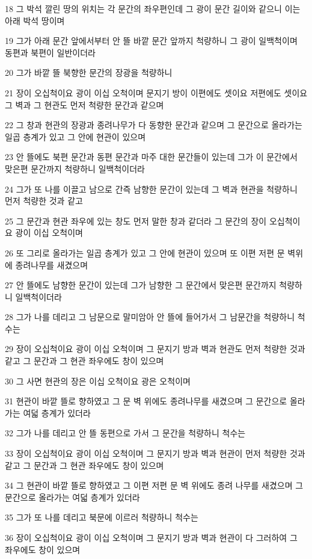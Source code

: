 \par 18 그 박석 깔린 땅의 위치는 각 문간의 좌우편인데 그 광이 문간 길이와 같으니 이는 아래 박석 땅이며
\par 19 그가 아래 문간 앞에서부터 안 뜰 바깥 문간 앞까지 척량하니 그 광이 일백척이며 동편과 북편이 일반이더라
\par 20 그가 바깥 뜰 북향한 문간의 장광을 척량하니
\par 21 장이 오십척이요 광이 이십 오척이며 문지기 방이 이편에도 셋이요 저편에도 셋이요 그 벽과 그 현관도 먼저 척량한 문간과 같으며
\par 22 그 창과 현관의 장광과 종려나무가 다 동향한 문간과 같으며 그 문간으로 올라가는 일곱 층계가 있고 그 안에 현관이 있으며
\par 23 안 뜰에도 북편 문간과 동편 문간과 마주 대한 문간들이 있는데 그가 이 문간에서 맞은편 문간까지 척량하니 일백척이더라
\par 24 그가 또 나를 이끌고 남으로 간즉 남향한 문간이 있는데 그 벽과 현관을 척량하니 먼저 척량한 것과 같고
\par 25 그 문간과 현관 좌우에 있는 창도 먼저 말한 창과 같더라 그 문간의 장이 오십척이요 광이 이십 오척이며
\par 26 또 그리로 올라가는 일곱 층계가 있고 그 안에 현관이 있으며 또 이편 저편 문 벽위에 종려나무를 새겼으며
\par 27 안 뜰에도 남향한 문간이 있는데 그가 남향한 그 문간에서 맞은편 문간까지 척량하니 일백척이더라
\par 28 그가 나를 데리고 그 남문으로 말미암아 안 뜰에 들어가서 그 남문간을 척량하니 척수는
\par 29 장이 오십척이요 광이 이십 오척이며 그 문지기 방과 벽과 현관도 먼저 척량한 것과 같고 그 문간과 그 현관 좌우에도 창이 있으며
\par 30 그 사면 현관의 장은 이십 오척이요 광은 오척이며
\par 31 현관이 바깥 뜰로 향하였고 그 문 벽 위에도 종려나무를 새겼으며 그 문간으로 올라가는 여덟 층계가 있더라
\par 32 그가 나를 데리고 안 뜰 동편으로 가서 그 문간을 척량하니 척수는
\par 33 장이 오십척이요 광이 이십 오척이며 그 문지기 방과 벽과 현관이 먼저 척량한 것과 같고 그 문간과 그 현관 좌우에도 창이 있으며
\par 34 그 현관이 바깥 뜰로 향하였고 그 이편 저편 문 벽 위에도 종려 나무를 새겼으며 그 문간으로 올라가는 여덟 층계가 있더라
\par 35 그가 또 나를 데리고 북문에 이르러 척량하니 척수는
\par 36 장이 오십척이요 광이 이십 오척이며 그 문지기 방과 벽과 현관이 다 그러하여 그 좌우에도 창이 있으며
